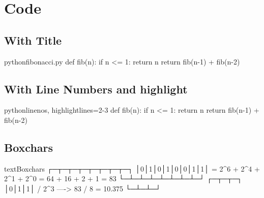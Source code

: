 \documentclass{article}
\begin{document}
\section{Code}

\subsection{With Title}
\begin{code}{python}{fibonacci.py}{}
def fib(n):
if n <= 1:
    return n
return fib(n-1) + fib(n-2)
\end{code}

\subsection{With Line Numbers and highlight}
\begin{code}{python}{}{linenos, highlightlines={2-3}}
def fib(n):
if n <= 1:
    return n
return fib(n-1) + fib(n-2)
\end{code}

\subsection{Boxchars}

\begin{code}{text}{Boxchars}{}
  ┌─┬─┬─┬─┬─┬─┬─┬─┐
  │0│1│0│1│0│0│1│1│ = 2^6 + 2^4 + 2^1 + 2^0 = 64 + 16 + 2 + 1 = 83
  └─┴─┴─┴─┴─┴─┴─┴─┘
            ┌─┬─┬─┐
            │0│1│1│ / 2^3     ----> 83 / 8 = 10.375
            └─┴─┴─┘
\end{code}

\end{document}
